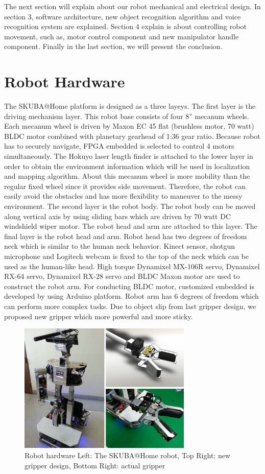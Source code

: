 \documentclass{llncs}
\begin{document}
The next section will explain about our robot mechanical and electrical design. In section 3, software architecture, new object recognition algorithm and voice recognition system are explained. Section 4 explain is about controlling robot movement, such as, motor control component and new manipulator handle component. Finally in the last section, we will present the conclusion.

\section{Robot Hardware}

The SKUBA@Home platform is designed as a three layeys. The first layer is the driving mechanism layer. This robot base consists of four 8'' mecanum wheels. Each mecanum wheel is driven by Maxon EC 45 flat (brushless motor, 70 watt) BLDC motor combined with planetary gearhead of 1:36 gear ratio. Because robot has to securely navigate, FPGA embedded is selected to control 4 motors simultaneously. The Hokuyo laser length finder is attached to the lower layer in order to obtain the environment information which will be used in localization and mapping algorithm. About this mecanum wheel is more mobility than the regular fixed wheel since it provides side movement. Therefore, the robot can easily avoid the obstacles and has more flexibility to maneuver to the messy environment. The second layer is the robot body. The robot body can be moved along vertical axis by using sliding bars which are driven by 70 watt DC windshield wiper motor. The robot head and arm are attached to this layer. The final layer is the robot head and arm. Robot head has two degrees of freedom neck which is similar to the human neck behavior. Kinect sensor, shotgun microphone and Logitech webcam is fixed to the top of the neck which can be used as the human-like head. High torque Dynamixel MX-106R servo, Dynamixel RX-64 servo, Dynamixel RX-28 servo and BLDC Maxon motor are used to construct the robot arm. For conducting BLDC motor, customized embedded is developed by using Arduino platform\cite{con_arm}. Robot arm has 6 degrees of freedom which can perform more complex tasks. Due to object slip from last gripper design, we proposed new gripper which more powerful and more sticky.

\begin{figure}
\centering
\includegraphics[height=6.2cm]{robot_hardware}
\caption{Robot hardware Left: The SKUBA@Home robot, Top Right: new gripper design, Bottom Right: actual gripper}
\label{fig:base}
\end{figure}
\end{document}
